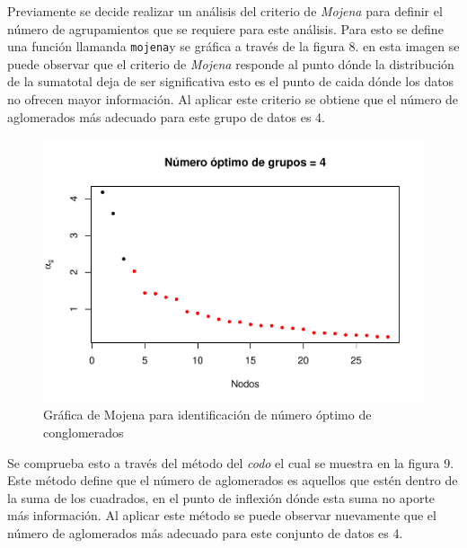 \documentclass[
]{article}
\begin{document}
Previamente se decide realizar un análisis del criterio de \emph{Mojena}
para definir el número de agrupamientos que se requiere para este
análisis. Para esto se define una función llamanda \texttt{mojena}y se
gráfica a través de la figura 8. en esta imagen se puede observar que el
criterio de \emph{Mojena} responde al punto dónde la distribución de la
sumatotal deja de ser significativa esto es el punto de caida dónde los
datos no ofrecen mayor información. Al aplicar este criterio se obtiene
que el número de aglomerados más adecuado para este grupo de datos es 4.

\begin{figure}
\centering
\includegraphics{4_actividad_cluster_files/figure-latex/Mojena-1.pdf}
\caption{Gráfica de Mojena para identificación de número óptimo de
conglomerados}
\end{figure}

Se comprueba esto a través del método del \emph{codo} el cual se muestra
en la figura 9. Este método define que el número de aglomerados es
aquellos que estén dentro de la suma de los cuadrados, en el punto de
inflexión dónde esta suma no aporte más información. Al aplicar este
método se puede observar nuevamente que el número de aglomerados más
adecuado para este conjunto de datos es 4.
\end{document}
